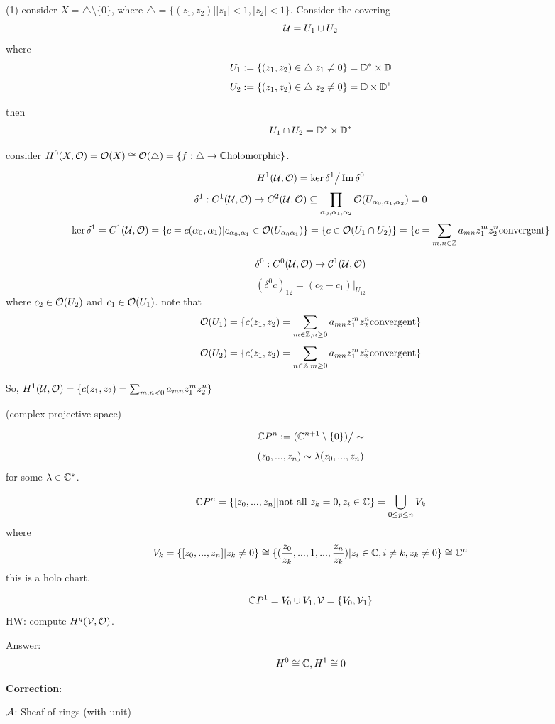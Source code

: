\begin{example}
(1) consider $X=\triangle\setminus\{0\}$, where $\triangle=
\{(z_1,z_2)||z_1|<1,|z_2|<1\}$. Consider the covering
$$\mathcal{U}=U_1\cup U_2$$
where
$$U_1:=\{(z_1,z_2)\in\triangle|z_1\neq 0\}=\mathbb{D}^*\times\mathbb{D}$$
$$U_2:=\{(z_1,z_2)\in\triangle|z_2\neq 0\}=\mathbb{D}\times\mathbb{D}^*$$

then
$$U_1\cap U_2=\mathbb{D}^*\times\mathbb{D}^*$$

consider $H^0(X,\mathcal{O})=\mathcal{O}(X)\cong\mathcal{O}(\triangle)
=\{f:\triangle\to\mathbb{C}\text{holomorphic}\}$.

$$H^1(\mathcal{U},\mathcal{O})=\ker\delta^1\big/\operatorname{Im}\delta^0$$
$$\delta^1:C^1(\mathcal{U},\mathcal{O})\to C^2(\mathcal{U},\mathcal{O})\subseteq
\prod_{\alpha_0,\alpha_1,\alpha_2}\mathcal{O}(U_{\alpha_0,\alpha_1,\alpha_2})=0$$
$$\ker\delta^1=
C^1(\mathcal{U},\mathcal{O})=\{c=c(\alpha_0,\alpha_1)|c_{\alpha_0,\alpha_1}\in\mathcal{O}(U_{\alpha_0\alpha_1})\}
=\{c\in\mathcal{O}(U_1\cap U_2)\}=\{c=\sum_{m,n\in\mathbb{Z}}a_{mn}z_1^mz_2^n\text{convergent}\}$$

$$\delta^0:C^0(\mathcal{U},\mathcal{O})\to\mathcal{C}^1(\mathcal{U},\mathcal{O})$$
$$(\delta^0c)_{12}=(c_2-c_1)|_{U_{12}}$$
where $c_2\in\mathcal{O}(U_2)$ and $c_1\in\mathcal{O}(U_1)$.
note that
$$\mathcal{O}(U_1)=\{c(z_1,z_2)=\sum_{m\in\mathbb{Z},n\geq 0}a_{mn}z_1^mz_2^n\text{convergent}\}$$
$$\mathcal{O}(U_2)=\{c(z_1,z_2)=\sum_{n\in\mathbb{Z},m\geq 0}a_{mn}z_1^mz_2^n\text{convergent}\}$$

So, $H^1(\mathcal{U},\mathcal{O})=
\{c(z_1,z_2)=\sum_{m,n<0}a_{mn}z_1^mz_2^n\}$
\end{example}

\begin{example}(complex projective space)

$$\mathbb{C} P^n:=(\mathbb{C}^{n+1}\setminus\{0\})\big/\sim$$
$$(z_0,...,z_n)\sim\lambda(z_0,...,z_n)$$
for some $\lambda\in\mathbb{C}^*$.

$$\mathbb{C} P^n=\{[z_0,...,z_n]|\text{not all $z_k=0$},z_i\in\mathbb{C}\}
=\bigcup_{0\leq p\leq n}V_k$$
where
$$V_k=\{[z_0,...,z_n]|z_k\neq 0\}
\cong \{(\frac{z_0}{z_k},...,1,...,\frac{z_n}{z_k})|
z_i\in\mathbb{C},i\neq k, z_k\neq 0\}\cong \mathbb{C}^n$$
this is a holo chart.

$$\mathbb{C} P^1=V_0\cup V_1,\mathcal{V}=\{V_0,\mathcal{V}_1\}$$
HW: compute $H^q(\mathcal{V},\mathcal{O})$.

Answer:
$$H^0\cong\mathbb{C},H^1\cong 0$$
\end{example}


\textbf{Correction}:

$\mathcal{A}$: Sheaf of rings (with unit)

